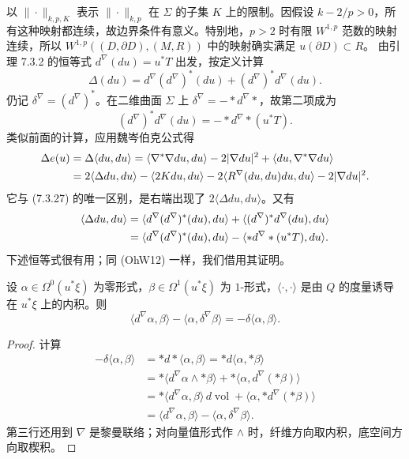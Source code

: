 以 $\|\cdot\|_{k,p,K}$ 表示 $\|\cdot\|_{k,p}$ 在 $\Sigma$ 的子集 $K$ 上的限制。因假设 $k-2/p>0$，所有这种映射都连续，故边界条件有意义。特别地，$p>2$ 时有限 $W^{1,p}$ 范数的映射连续，所以 $W^{1,p}((D,\partial D),(M,R))$ 中的映射确实满足 $u(\partial D)\subset R$。
由引理 7.3.2 的恒等式 $d^\nabla(du)=u^*T$ 出发，按定义计算
\[
 \Delta(du)=d^\nabla(d^\nabla)^*(du)+(d^\nabla)^*d^\nabla(du).
\]
仍记 $\delta^\nabla=(d^\nabla)^*$。在二维曲面 $\Sigma$ 上
$\delta^\nabla=-*d^\nabla*$，故第二项成为
\begin{equation}
 (d^\nabla)^*d^\nabla(du)=-*d^\nabla*(u^*T).
 \label{eq:ch8-laplacian-du-torsion}
\end{equation}
类似前面的计算，应用魏岑伯克公式得
\begin{align}
 \Delta e(u)&=\Delta\langle du,du\rangle
 =\langle\nabla^*\nabla du,du\rangle-2|\nabla du|^2
   +\langle du,\nabla^*\nabla du\rangle \notag\\
 &=2\langle\Delta du,du\rangle-\langle2Kdu,du\rangle
 -2\langle R^\nabla(du,du)du,du\rangle-2|\nabla du|^2.
 \label{eq:ch8-off-shell-bochner}
\end{align}
它与 (7.3.27) 的唯一区别，是右端出现了 $2\langle\Delta du,du\rangle$。又有
\begin{align}
 \langle\Delta du,du\rangle
 &=\langle d^\nabla(d^\nabla)^*(du),du\rangle
   +\langle(d^\nabla)^*d^\nabla(du),du\rangle\notag\\
 &=\langle d^\nabla(d^\nabla)^*(du),du\rangle
   -\langle*d^\nabla*(u^*T),du\rangle .
 \label{eq:ch8-off-shell-laplacian-split}
\end{align}
下述恒等式很有用；同 (OhW12) 一样，我们借用其证明。
\begin{lemma}\label{lem:ch8-covariant-codifferential-pairing}
设 $\alpha\in\Omega^0(u^*\xi)$ 为零形式，$\beta\in\Omega^1(u^*\xi)$ 为 $1$-形式，$\langle\cdot,\cdot\rangle$ 是由 $Q$ 的度量诱导在 $u^*\xi$ 上的内积。则
\[
 \langle d^\nabla\alpha,\beta\rangle-\langle\alpha,\delta^\nabla\beta\rangle
 =-\delta\langle\alpha,\beta\rangle.
\]
\end{lemma}

\begin{proof}
计算
\begin{align*}
 -\delta\langle\alpha,\beta\rangle
 &=*d*\langle\alpha,\beta\rangle=*d\langle\alpha,*\beta\rangle\\
 &=*\langle d^\nabla\alpha\wedge*\beta\rangle
   +*\langle\alpha,d^\nabla(*\beta)\rangle\\
 &=*\langle d^\nabla\alpha,\beta\rangle\,d\operatorname{vol}
   +\langle\alpha,*d^\nabla(*\beta)\rangle\\
 &=\langle d^\nabla\alpha,\beta\rangle-\langle\alpha,\delta^\nabla\beta\rangle.
\end{align*}
第三行还用到 $\nabla$ 是黎曼联络；对向量值形式作 $\wedge$ 时，纤维方向取内积，底空间方向取楔积。
\end{proof}

